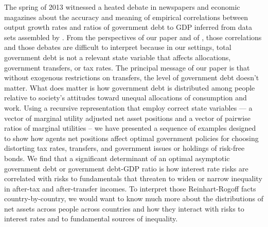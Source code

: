 \documentclass[thmsb,11pt]{article}
\begin{document}
  The spring of 2013 witnessed a heated debate in newspapers and economic magazines about the accuracy and meaning of empirical  correlations between output growth rates and
ratios of government debt to GDP inferred from data sets assembled by \cite{Reinhart2010}.
From the  perspectives of our paper and of  \cite{Wer07a}, those correlations and those debates are  difficult to interpret
because in our settings, total government debt is not a relevant state variable that affects allocations, government transfers, or tax rates.
The principal message of our paper  is that  without exogenous restrictions on transfers, the level of government debt doesn't matter. What
 does matter is how government  debt is distributed among people relative to society's attitudes toward unequal allocations of consumption and work.  Using a recursive representation that employ correct state variables --- a vector of marginal utility adjusted net asset positions and a vector of pairwise ratios of marginal utilities  --  we have
 presented  a sequence of examples designed to show how  agents net positions affect optimal government policies for choosing distorting tax
 rates, transfers, and government issues or holdings of risk-free bonds. We find that a significant determinant of an optimal asymptotic government
 debt or government debt-GDP ratio is how interest rate risks are correlated with risks to fundamentals that threaten to widen or narrow
 inequality in after-tax and after-transfer incomes. To interpret those Reinhart-Rogoff facts country-by-country, we would
 want to know much more about the distributions of net assets across people across countries  and how they interact with
 risks to interest rates and to fundamental sources of inequality.

\smallskip

\smallskip

\smallskip

\pagebreak
\end{document}
